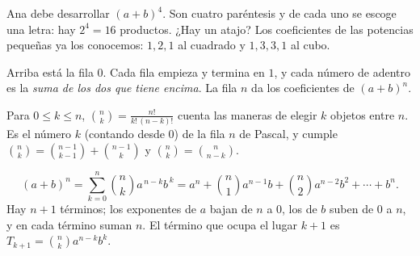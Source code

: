 \documentclass[11pt,a4paper]{article}
\begin{document}

Ana debe desarrollar $(a+b)^4$. Son cuatro paréntesis y de cada uno se escoge una letra: hay $2^4=16$ productos.
¿Hay un atajo? Los coeficientes de las potencias pequeñas ya los conocemos: $1,2,1$ al cuadrado y $1,3,3,1$ al cubo.

\begin{minipage}[c]{0.5\linewidth}
\begin{definicion}
Arriba está la fila $0$. Cada fila empieza y termina en $1$, y cada número de adentro es la \emph{suma de los dos
que tiene encima}. La fila $n$ da los coeficientes de $(a+b)^n$.
\end{definicion}
\end{minipage}\hfill
\begin{minipage}[c]{0.46\linewidth}\centering
{}
\end{minipage}

\begin{definicion}
Para $0\le k\le n$, $\displaystyle\binom{n}{k}=\frac{n!}{k!\,(n-k)!}$ cuenta las maneras de elegir $k$ objetos entre $n$.
Es el número $k$ (contando desde $0$) de la fila $n$ de Pascal, y cumple
$\displaystyle\binom{n}{k}=\binom{n-1}{k-1}+\binom{n-1}{k}$ y $\displaystyle\binom{n}{k}=\binom{n}{n-k}$.
\end{definicion}

\begin{propiedad}
\[ (a+b)^n=\sum_{k=0}^{n}\binom{n}{k}a^{\,n-k}b^{\,k}=a^n+\binom{n}{1}a^{n-1}b+\binom{n}{2}a^{n-2}b^2+\cdots+b^n . \]
Hay $n+1$ términos; los exponentes de $a$ bajan de $n$ a $0$, los de $b$ suben de $0$ a $n$, y en cada término suman
$n$. El término que ocupa el lugar $k+1$ es $T_{k+1}=\binom{n}{k}a^{n-k}b^{k}$.
\end{propiedad}
\end{document}

